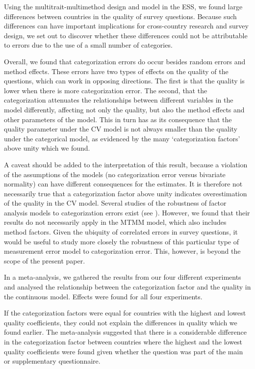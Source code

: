 \documentclass[a4paper,12pt]{article}
\begin{document}
Using the multitrait-multimethod design and model in the ESS, we found large differences between countries in the quality of survey questions. Because such differences can have important implications for cross-country research and survey design, we set out to discover whether these differences could not be attributable to errors due to the use of a small number of categories. 

Overall, we found that categorization errors do occur besides random errors and method effects. These errors have two types of effects on the quality of the questions, which can work in opposing directions. The first is that the quality is lower when there is more categorization error. The second, that the categorization attenuates the relationships between different variables in the model differently, affecting not only the quality, but also the method effects and other parameters of the model. This in turn has as its consequence that the quality parameter under the CV model is not always smaller than the quality under the categorical model, as evidenced by the many `categorization factors' above unity which we found. 

A caveat should be added to the interpretation of this result, because a violation of the assumptions of the models (no categorization error versus bivariate normality) can have different consequences for the estimates. It is therefore not necessarily true that a categorization factor above unity indicates overestimation of the quality in the CV model. Several studies of the robustness of factor analysis models to categorization errors exist (see \citealt{olsson_robustness_1979}). However, we found that their results do not necessarily apply in the MTMM model, which also includes method factors. Given the ubiquity of correlated errors in survey questions, it would be useful to study more closely the robustness of this particular type of measurement error model to categorization error. This, however, is beyond the scope of the present paper.

In a meta-analysis, we gathered the results from our four different experiments and analysed the relationship between the categorization factor and the quality in the continuous model. Effects were found for all four experiments.

If the categorization factors were equal for countries with the highest and lowest quality coefficients, they could not explain the differences in quality which we found earlier. The meta-analysis suggested that there is a considerable difference in the categorization factor between countries where the highest and the lowest quality coefficients were found given whether the question was part of the main or supplementary questionnaire.
\end{document}
